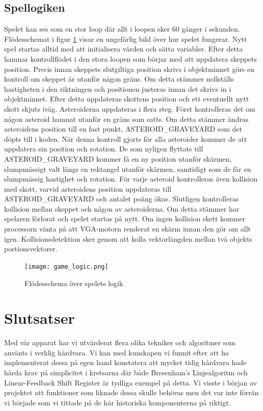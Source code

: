 \documentclass[a4paper]{article}
\begin{document}
    \subsection{Spellogiken}
	Spelet kan ses som en stor loop där allt i loopen sker 60 gånger i sekunden. Flödesschemat
	i figur \ref{fig:game_logic} visar en ungefärlig bild över hur spelet fungerar. Nytt spel
	startas alltid med att initialisera värden och sätta variabler. Efter detta hamnar kontrollflödet
	i den stora loopen som börjar med att uppdatera skeppets position. Precis innan skeppets slutgiltiga
	position skrivs i objektminnet görs en kontroll om skeppet är utanför någon gräns. Om detta 
	stämmer nollställs hastigheten i den riktningen och positionen justeras innan det
	skrivs in i objektminnet. Efter detta uppdateras skottens position och ett eventuellt nytt 
	skott skjuts iväg. Asteroiderna uppdateras i flera steg. Först kontrolleras det om någon asteroid 
	hamnat utanför en gräns som satts. Om detta stämmer ändras asteroidens position till en fast punkt,
    ASTEROID\_GRAVEYARD som det döpts till i koden. När denna kontroll gjorts för alla asteroider kommer 
	de att uppdatera sin position och rotation. De som nyligen flyttats till ASTEROID\_GRAVEYARD kommer 
	få en ny position utanför skärmen, slumpmässigt valt längs en rektangel utanför skärmen, samtidigt 
	som de får en slumpmässig hastighet och rotation. För varje asteroid kontrolleras även kollision
	med skott, varvid asteroidens position uppdateras till ASTEROID\_GRAVEYARD och antalet poäng ökas. 
	Slutligen kontrolleras kollision mellan skeppet och någon av asteroiderna. Om detta stämmer har 
	spelaren förlorat och spelet startas på nytt. Om ingen kollision skett kommer processorn vänta på att
	VGA-motorn renderat en skärm innan den gör om allt igen. Kollisionsdetektion sker genom att kolla 
	vektorlängden mellan två objekts postionsvektorer.
	
	\begin{figure}[H]
        \centering
        \texttt{[image: game\_logic.png]}
        \caption{Flödesschema över spelets logik}
        \label{fig:game_logic}
    \end{figure}

	\section{Slutsatser}
        Med vår apparat har vi utvärderat flera olika tekniker och algoritmer som använts i verklig
        hårdvara. Vi kan med kunskapen vi funnit efter att ha implementerat dessa på egen hand
        konstatera att mycket tidig hårdvara hade hårda krav på simplicitet i kretsarna där både
        Bresenham's Linjealgoritm och Linear-Feedback Shift Register är tydliga exempel på detta. Vi
        visste i början av projektet att funktioner som liknade dessa skulle behövas men det var inte
        förrän vi började som vi tittade på de här historiska komponenterna på riktigt.
\end{document}
